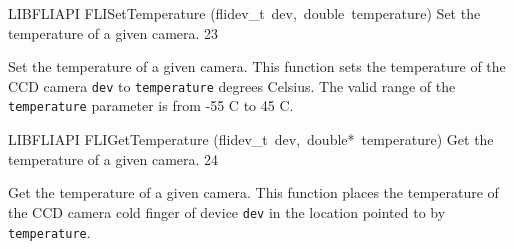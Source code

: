\documentclass{article}
\begin{document}
\begin{cxxfunction}
{LIBFLIAPI}
        {FLISetTemperature}
        {(flidev\_t\ dev,\ double\ temperature)}
        {
 Set the temperature of a given camera.}
        {23}
\begin{cxxdoc}

Set the temperature of a given camera.  This function sets the
temperature of the CCD camera \texttt{dev} to \texttt{temperature}
degrees Celsius.  The valid range of the \texttt{temperature}
parameter is from -55 C to 45 C.


\end{cxxdoc}
\end{cxxfunction}
\begin{cxxfunction}
{LIBFLIAPI}
        {FLIGetTemperature}
        {(flidev\_t\ dev,\ double*\ temperature)}
        {
 Get the temperature of a given camera.}
        {24}
\begin{cxxdoc}

Get the temperature of a given camera.  This function places the
temperature of the CCD camera cold finger of device \texttt{dev} in
the location pointed to by \texttt{temperature}.


\end{cxxdoc}
\end{cxxfunction}
\end{document}
